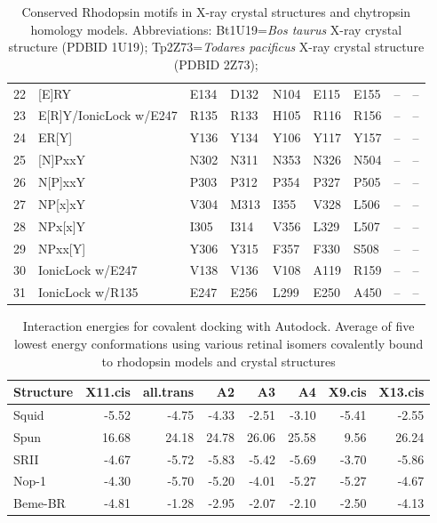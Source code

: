 \begin{table}[tbp]
\begin{tabular}{rllllllll}
   \hline
22 & [E]RY & E134 & D132 & N104 & E115 & E155 & -- & -- \\ 
  23 & E[R]Y/IonicLock w/E247 & R135 & R133 & H105 & R116 & R156 & -- & -- \\ 
  24 & ER[Y] & Y136 & Y134 & Y106 & Y117 & Y157 & -- & -- \\ 
   \hline
25 & [N]PxxY & N302 & N311 & N353 & N326 & N504 & -- & -- \\ 
  26 & N[P]xxY & P303 & P312 & P354 & P327 & P505 & -- & -- \\ 
  27 & NP[x]xY & V304 & M313 & I355 & V328 & L506 & -- & -- \\ 
  28 & NPx[x]Y & I305 & I314 & V356 & L329 & L507 & -- & -- \\ 
  29 & NPxx[Y] & Y306 & Y315 & F357 & F330 & S508 & -- & -- \\ 
   \hline
30 & IonicLock w/E247 & V138 & V136 & V108 & A119 & R159 & -- & -- \\ 
  31 & IonicLock w/R135 & E247 & E256 & L299 & E250 & A450 & -- & -- \\ 
   \hline
\hline
\end{tabular}
\caption[Locations of key residues in rhodopsin structural motifs]{Conserved Rhodopsin motifs in X-ray crystal structures and chytropsin homology models. Abbreviations: Bt1U19=\textit{Bos taurus} X-ray crystal structure (PDBID 1U19); Tp2Z73=\textit{Todares pacificus} X-ray crystal structure (PDBID 2Z73);} 
\label{tab:ChRhod_motifs}
\end{table}
\begin{table}[tbp]
\centering
\begin{tabular}{lrrrrrrr}
  \hline
\hline
Structure & X11.cis & all.trans & A2 & A3 & A4 & X9.cis & X13.cis \\ 
  \hline
Squid & -5.52 & -4.75 & -4.33 & -2.51 & -3.10 & -5.41 & -2.55 \\ 
  Spun & 16.68 & 24.18 & 24.78 & 26.06 & 25.58 & 9.56 & 26.24 \\ 
  SRII & -4.67 & -5.72 & -5.83 & -5.42 & -5.69 & -3.70 & -5.86 \\ 
  Nop-1 & -4.30 & -5.70 & -5.20 & -4.01 & -5.27 & -5.27 & -4.67 \\ 
  Beme-BR & -4.81 & -1.28 & -2.95 & -2.07 & -2.10 & -2.50 & -4.13 \\ 
   \hline
\hline
\end{tabular}
\caption[Interaction energies for covalent docking]{Interaction energies for covalent docking with Autodock. Average of five lowest energy conformations using various retinal isomers covalently bound to rhodopsin models and crystal structures} 
\label{tab:ChRhod_motifs}
\end{table}
